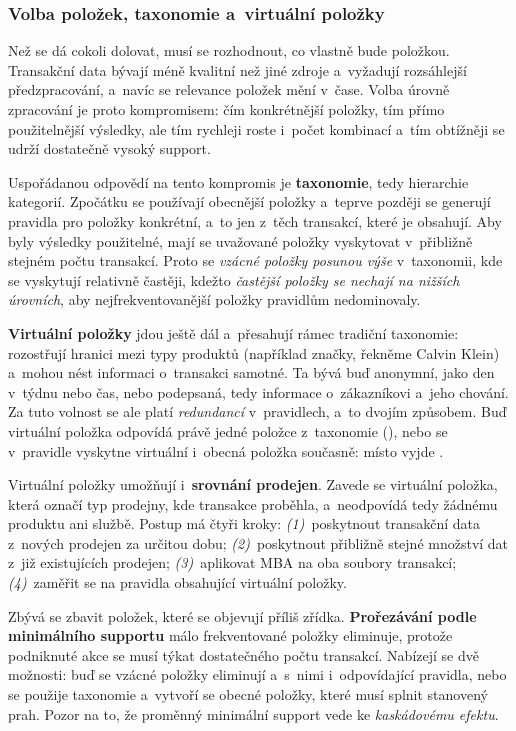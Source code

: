 \documentclass[11pt,a4paper]{article}
\theoremstyle{definition}
\begin{document}
\subsubsection{Volba položek, taxonomie a~virtuální položky}

Než se dá cokoli dolovat, musí se rozhodnout, co vlastně bude položkou. Transakční data bývají
méně kvalitní než jiné zdroje a~vyžadují rozsáhlejší předzpracování, a~navíc se relevance
položek mění v~čase. Volba úrovně zpracování je proto kompromisem: čím konkrétnější položky,
tím přímo použitelnější výsledky, ale tím rychleji roste i~počet kombinací a~tím obtížněji se
udrží dostatečně vysoký support.

Uspořádanou odpovědí na tento kompromis je \textbf{taxonomie}, tedy hierarchie kategorií.
Zpočátku se používají obecnější položky a~teprve později se generují pravidla pro položky
konkrétní, a~to jen z~těch transakcí, které je obsahují. Aby byly výsledky použitelné, mají se
uvažované položky vyskytovat v~přibližně stejném počtu transakcí. Proto se \emph{vzácné
položky posunou výše} v~taxonomii, kde se vyskytují relativně častěji, kdežto \emph{častější
položky se nechají na nižších úrovních}, aby nejfrekventovanější položky pravidlům
nedominovaly.

\textbf{Virtuální položky} jdou ještě dál a~přesahují rámec tradiční taxonomie: rozostřují
hranici mezi typy produktů (například značky, řekněme Calvin Klein) a~mohou nést informaci
o~transakci samotné. Ta bývá buď anonymní, jako den v~týdnu nebo čas, nebo podepsaná, tedy
informace o~zákazníkovi a~jeho chování. Za tuto volnost se ale platí \emph{redundancí}
v~pravidlech, a~to dvojím způsobem. Buď virtuální položka odpovídá právě jedné položce
z~taxonomie (), nebo se v~pravidle vyskytne virtuální
i~obecná položka současně: místo  vyjde .

Virtuální položky umožňují i~\textbf{srovnání prodejen}. Zavede se virtuální položka, která
označí typ prodejny, kde transakce proběhla, a~neodpovídá tedy žádnému produktu ani službě.
Postup má čtyři kroky: \emph{(1)}~poskytnout transakční data z~nových prodejen za určitou
dobu; \emph{(2)}~poskytnout přibližně stejné množství dat z~již existujících prodejen;
\emph{(3)}~aplikovat MBA na oba soubory transakcí; \emph{(4)}~zaměřit se na pravidla
obsahující virtuální položky.

Zbývá se zbavit položek, které se objevují příliš zřídka. \textbf{Prořezávání podle
minimálního supportu} málo frekventované položky eliminuje, protože podniknuté akce se musí
týkat dostatečného počtu transakcí. Nabízejí se dvě možnosti: buď se vzácné položky
eliminují a~s~nimi i~odpovídající pravidla, nebo se použije taxonomie a~vytvoří se obecné
položky, které musí splnit stanovený prah. Pozor na to, že proměnný minimální support vede ke
\emph{kaskádovému efektu}.
\end{document}
